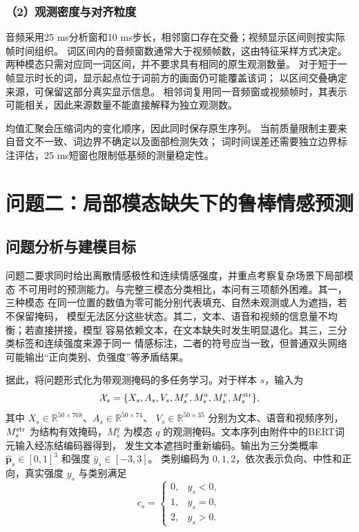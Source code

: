 \documentclass[bwprint]{gmcmthesis}
\begin{document}
\subsubsection*{（2）观测密度与对齐粒度}
音频采用25 ms分析窗和10 ms步长，相邻窗口存在交叠；视频显示区间则按实际帧时间组织。
词区间内的音频窗数通常大于视频帧数，这由特征采样方式决定。
两种模态只需对应同一词区间，并不要求具有相同的原生观测数量。
对于短于一帧显示时长的词，显示起点位于词前方的画面仍可能覆盖该词；
以区间交叠确定来源，可保留这部分真实显示信息。
相邻词复用同一音频窗或视频帧时，其表示可能相关，因此来源数量不能直接解释为独立观测数。

均值汇聚会压缩词内的变化顺序，因此同时保存原生序列。
当前质量限制主要来自音文不一致、词边界不确定以及面部检测失效；
词时间误差还需要独立边界标注评估，25 ms短窗也限制低基频的测量稳定性。

\section{问题二：局部模态缺失下的鲁棒情感预测}
\label{sec:problem2}

\subsection{问题分析与建模目标}

问题二要求同时给出离散情感极性和连续情感强度，并重点考察复杂场景下局部模态
不可用时的预测能力。与完整三模态分类相比，本问有三项额外困难。其一，三种模态
在同一位置的数值为零可能分别代表填充、自然未观测或人为遮挡，若不保留掩码，
模型无法区分这些状态。其二，文本、语音和视频的信息量不均衡；若直接拼接，模型
容易依赖文本，在文本缺失时发生明显退化。其三，三分类标签和连续强度来源于同一
情感标注，二者的符号应当一致，但普通双头网络可能输出“正向类别、负强度”等矛盾结果。

据此，将问题形式化为带观测掩码的多任务学习。对于样本 $s$，输入为
\begin{equation}
 \mathcal X_s=\{X_s,A_s,V_s,M_s^x,M_s^a,M_s^v,M_s^{\rm str}\},
 \label{eq:p2-input}
\end{equation}
其中 $X_s\in\mathbb R^{50\times768}$、$A_s\in\mathbb R^{50\times74}$、
$V_s\in\mathbb R^{50\times35}$ 分别为文本、语音和视频序列，$M_s^{\rm str}$
为结构有效掩码，$M_s^q$ 为模态 $q$ 的观测掩码。文本序列由附件中的BERT词元输入经冻结编码器得到，
发生文本遮挡时重新编码。输出为三分类概率
$\hat{\boldsymbol p}_s\in[0,1]^3$ 和强度 $\hat y_s\in[-3,3]$。
类别编码为 $0,1,2$，依次表示负向、中性和正向，真实强度 $y_s$ 与类别满足
\begin{equation}
 c_s=\begin{cases}0,&y_s<0,\\1,&y_s=0,\\2,&y_s>0.\end{cases}
 \label{eq:p2-label-relation}
\end{equation}
\end{document}
